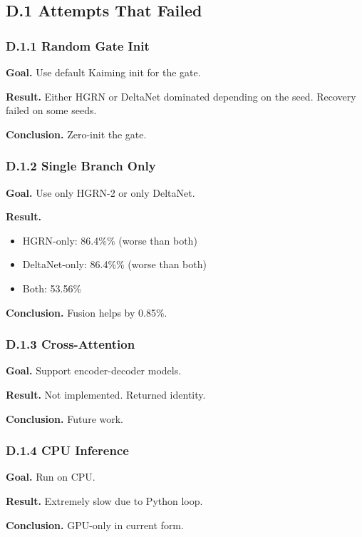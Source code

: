 \subsection{D.1 Attempts That Failed}

\subsubsection{D.1.1 Random Gate Init}

\textbf{Goal.} Use default Kaiming init for the gate.

\textbf{Result.} Either HGRN or DeltaNet dominated depending on the seed. 
Recovery failed on some seeds.

\textbf{Conclusion.} Zero-init the gate.

\subsubsection{D.1.2 Single Branch Only}

\textbf{Goal.} Use only HGRN-2 or only DeltaNet.

\textbf{Result.}
\begin{itemize}
\item HGRN-only: 86.4\%\% (worse than both)
\item DeltaNet-only: 86.4\%\% (worse than both)
\item Both: 53.56\%

\end{itemize}
\textbf{Conclusion.} Fusion helps by 0.85\%.

\subsubsection{D.1.3 Cross-Attention}

\textbf{Goal.} Support encoder-decoder models.

\textbf{Result.} Not implemented. Returned identity.

\textbf{Conclusion.} Future work.

\subsubsection{D.1.4 CPU Inference}

\textbf{Goal.} Run on CPU.

\textbf{Result.} Extremely slow due to Python loop.

\textbf{Conclusion.} GPU-only in current form.

